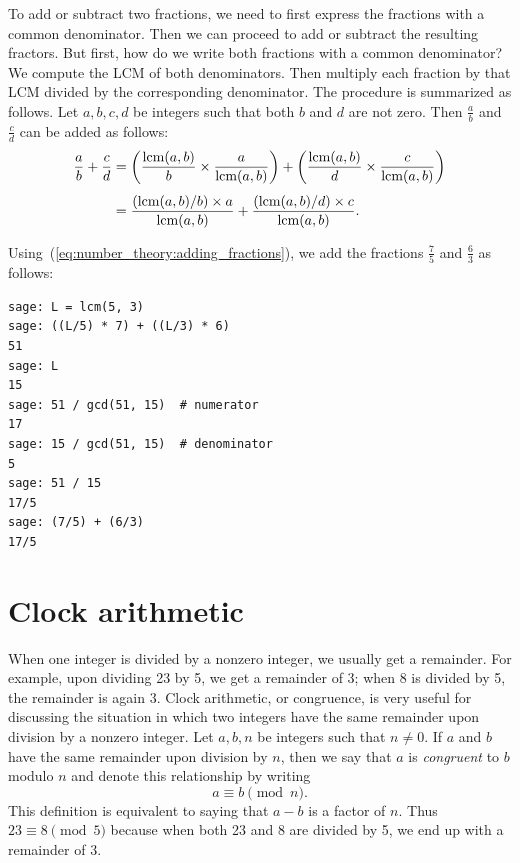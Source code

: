 To add or subtract two fractions, we need to first express the
fractions with a common denominator. Then we can proceed to add or
subtract the resulting fractors. But first, how do we write both
fractions with a common denominator? We compute the LCM of both
denominators. Then multiply each fraction by that LCM divided by the
corresponding denominator. The procedure is summarized as follows. Let
$a,b,c,d$ be integers such that both $b$ and $d$ are not zero. Then
$\frac{a}{b}$ and $\frac{c}{d}$ can be added as follows:
%
\begin{equation}
\label{eq:number_theory:adding_fractions}
\begin{aligned}
\frac{a}{b} + \frac{c}{d}
&=
\left( \frac{\operatorname*{\text{lcm}}(a,b)}{b} \times \frac{a}{\operatorname*{\text{lcm}}(a,b)} \right)
+
\left( \frac{\operatorname*{\text{lcm}}(a,b)}{d} \times \frac{c}{\operatorname*{\text{lcm}}(a,b)} \right) \\[4pt]
&=
\frac{(\operatorname*{\text{lcm}}(a,b) / b) \times a} {\operatorname*{\text{lcm}}(a,b)}
+
\frac{(\operatorname*{\text{lcm}}(a,b) / d) \times c} {\operatorname*{\text{lcm}}(a,b)}.
\end{aligned}
\end{equation}

Using~(\ref{eq:number_theory:adding_fractions}), we add the fractions
$\frac{7}{5}$ and $\frac{6}{3}$ as follows:

\begin{lstlisting}
sage: L = lcm(5, 3)
sage: ((L/5) * 7) + ((L/3) * 6)
51
sage: L
15
sage: 51 / gcd(51, 15)  # numerator
17
sage: 15 / gcd(51, 15)  # denominator
5
sage: 51 / 15
17/5
sage: (7/5) + (6/3)
17/5
\end{lstlisting}



\section{Clock arithmetic}

When one integer is divided by a nonzero integer, we usually get a
remainder. For example, upon dividing 23 by 5, we get a remainder of
3; when 8 is divided by 5, the remainder is again 3. Clock arithmetic,
or congruence, is very useful for discussing the situation in which
two integers have the same remainder upon division by a nonzero
integer. Let $a,b,n$ be integers such that $n \neq 0$. If $a$ and $b$
have the same remainder upon division by $n$, then we say that $a$ is
\emph{congruent} to $b$ modulo $n$ and denote this relationship by
writing
\[
a \equiv b \pmod{n}.
\]
This definition is equivalent to saying that $a - b$ is a factor of
$n$. Thus $23 \equiv 8 \pmod{5}$ because when both 23 and 8 are
divided by 5, we end up with a remainder of 3.

